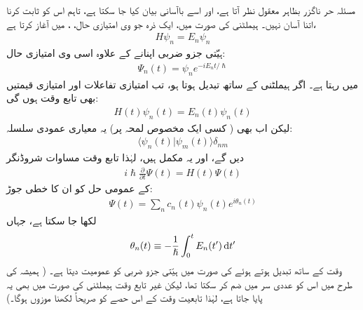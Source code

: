  
مسئلہ حر ناگزر بظاہر معقول نظر آتا ہے، اور اسے باآسانی بیان کیا جا سکتا ہے، تاہم اس کو ثابت کرنا اتنا آسان نہیں۔  ہیملٹنی کی صورت میں، ایک ذرہ جو  وی امتیازی حال، ، میں آغاز کرتا ہے،
\begin{align}
H \psi_n = E_n \psi_n
\end{align}
 ہیّتی جزو ضربی اپنانے کے علاوہ اسی  وی امتیازی حال:
\begin{align}
\Psi_n (t) = \psi_n e^{-i E_n t/ \hslash}
\end{align}
میں رہتا ہے۔ اگر ہیملٹنی  کے ساتھ تبدیل ہوتا ہو، تب امتیازی تفاعلات اور امتیازی قیمتیں بھی تابع وقت ہوں گی:
\begin{align}\label{مساوات_حر_تابع_وقت_ہیملٹنی_توانائی}
H(t) \psi_n (t) = E_n (t) \psi_n (t)
\end{align}
لیکن اب بھی ( کسی ایک مخصوص لمحہ پر) یہ معیاری عمودی سلسلہ: 
\begin{align}\label{مساوات_حر_لمحاتی_معیاری_عمودی}
\langle \psi_n (t) | \psi_m (t) \rangle \delta_{nm} 
\end{align}
دیں گے، اور یہ مکمل ہیں، لہٰذا تابع وقت مساوات شروڈنگر 
\begin{align}\label{مساوات_حر_مساوات_شروڈنگر_الف}
i \hslash \frac{\partial}{\partial t} \Psi (t) = H (t) \Psi (t)
\end{align}
کے عمومی حل کو ان کا خطی جوڑ:
\begin{align}\label{مساوات_حر_مساوات_شروڈنگر_ب}
\Psi (t) = \sum_n c_n (t) \psi_n (t) e^{i \theta_n (t)}
\end{align}
لکھا جا سکتا ہے، جہاں 
\begin{align}\label{مساوات_حر_مساوات_شروڈنگر_پ}
\theta_n (t) \equiv - \frac{1}{\hslash} \int_0^t E_n (t') \dif t'
\end{align}
وقت کے ساتھ تبدیل ہوتے ہوئے  کی صورت میں  ہیّتی جزو ضربی کو عمومیت دیتا ہے۔ ( ہمیشہ کی طرح میں اس کو عددی سر  میں ضم کر سکتا تھا، لیکن غیر تابع وقت ہیملٹنی کی صورت میں بھی یہ پایا جاتا ہے، لہٰذا تابعیت وقت کے اس حصے کو صریحاً لکھنا موزوں ہوگا۔) 

